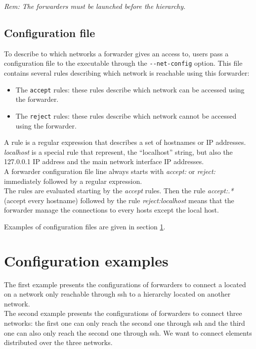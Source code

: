 \noindent\textit{Rem: The forwarders must be launched before the \diet
  hierarchy.}


\subsection{Configuration file}
To describe to which networks a forwarder gives an access to, users pass a
configuration file to the executable through the \verb#--net-config#
option. This file contains several rules describing which network is
reachable using this forwarder:
\begin{itemize}
\item The \verb#accept# rules: these rules describe which network can
  be accessed using the forwarder.
\item The \verb#reject# rules: these rules describe which network
  cannot be accessed using the forwarder.\\
\end{itemize}

A rule is a regular expression that describes a set of hostnames or IP
addresses. \textit{localhost} is a special rule that represent, the
``localhost'' string, but also the 127.0.0.1 IP address and the main
network interface IP addresses.\\

A \diet forwarder configuration file line always starts with
\textit{accept:} or \textit{reject:} immediately followed by a regular
expression.\\

The rules are evaluated starting by the \textit{accept} rules. Then
the rule \textit{accept:.*} (accept every hostname) followed by the
rule \textit{reject:localhost} means that the forwarder manage the
connections to every hosts except the local host.

Examples of configuration files are given in section
\ref{sec:ForwarderExamples}.


\section{Configuration examples}
\label{sec:ForwarderExamples}
The first example presents the configurations of \diet forwarders to
connect a \sed located on a network only reachable through ssh to a
\diet hierarchy located on another network.\\

The second example presents the configurations of \diet forwarders to
connect three networks: the first one can only reach the second one
through ssh and the third one can also only reach the second one
through ssh. We want to connect \diet elements distributed over the
three networks.
